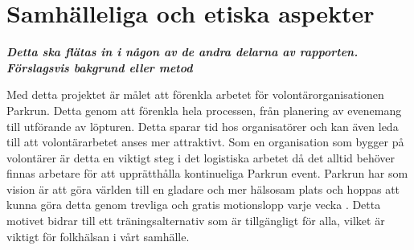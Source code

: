 \section{Samhälleliga och etiska aspekter}

\textbf{\textit{Detta ska flätas in i någon av de andra delarna av rapporten. Förslagsvis bakgrund eller metod}}

Med detta projektet är målet att förenkla arbetet för volontärorganisationen Parkrun. Detta genom att förenkla hela processen, från planering av evenemang till utförande av löpturen. Detta sparar tid hos organisatörer och kan även leda till att volontärarbetet anses mer attraktivt. Som en organisation som bygger på volontärer är detta en viktigt steg i det logistiska arbetet då det alltid behöver finnas arbetare för att upprätthålla kontinueliga Parkrun event. Parkrun har som vision är att göra världen till en gladare och mer hälsosam plats och hoppas att kunna göra detta genom trevliga och gratis motionslopp varje vecka \cite{omOss}. Detta motivet bidrar till ett träningsalternativ som är tillgängligt för alla, vilket är viktigt för folkhälsan i vårt samhälle.
